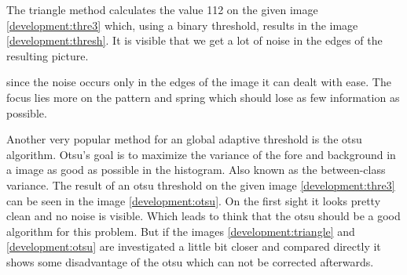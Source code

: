 The triangle method calculates the value 112 on the given image \ref{development:thre3} which, using a binary threshold, results in the image \ref{development:thresh}. It is visible that we get a lot of noise in the edges of the resulting picture. \\
\begin{center}
	\label{development:thresh}
\end{center}
since the noise occurs only in the edges of the image it can dealt with ease. The focus lies more on the pattern and spring which should lose as few information as possible.

Another very popular method for an global adaptive threshold is the otsu algorithm. Otsu's goal is to maximize the variance of the fore and background in a image as good as possible in the histogram. Also known as the between-class variance. The result of an otsu threshold on the given image \ref{development:thre3} can be seen in the image \ref{development:otsu}. On the first sight it looks pretty clean and no noise is visible. Which leads to think that the otsu should be a good algorithm for this problem. But if the images \ref{development:triangle} and \ref{development:otsu} are investigated a little bit closer and compared directly it shows some disadvantage of the otsu which can not be corrected afterwards.\\


